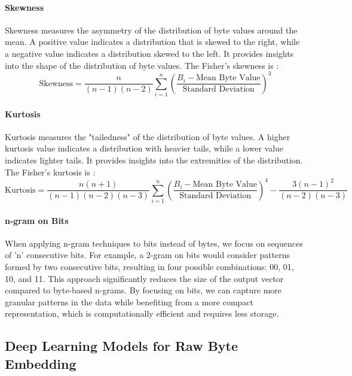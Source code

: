         \paragraph{Skewness}Skewness\cite{wheeler_problems_2011} measures the asymmetry of the distribution of byte values around the mean. A positive value indicates a distribution that is skewed to the right, while a negative value indicates a distribution skewed to the left. It provides insights into the shape of the distribution of byte values. The Fisher’s skewness\cite{cain_univariate_2017} is :
        \begin{equation}
        \text{Skewness} = \frac{n}{(n-1)(n-2)} \sum_{i=1}^{n} \left( \frac{B_i - \text{Mean Byte Value}}{\text{Standard Deviation}} \right)^3
        \label{eq:skewness}
        \end{equation}

        \paragraph{Kurtosis}Kurtosis\cite{wheeler_problems_2011} measures the "tailedness" of the distribution of byte values. A higher kurtosis value indicates a distribution with heavier tails, while a lower value indicates lighter tails. It provides insights into the extremities of the distribution. The Fisher’s kurtosis\cite{cain_univariate_2017} is :
        \begin{equation}
        \text{Kurtosis} = \frac{n(n+1)}{(n-1)(n-2)(n-3)} \sum_{i=1}^{n} \left( \frac{B_i - \text{Mean Byte Value}}{\text{Standard Deviation}} \right)^4 - \frac{3(n-1)^2}{(n-2)(n-3)}
        \label{eq:kurtosis}
        \end{equation}

        \paragraph{n-gram on Bits}When applying n-gram techniques to bits instead of bytes, we focus on sequences of 'n' consecutive bits. For example, a 2-gram on bits would consider patterns formed by two consecutive bits, resulting in four possible combinations: 00, 01, 10, and 11. This approach significantly reduces the size of the output vector compared to byte-based n-grams. By focusing on bits, we can capture more granular patterns in the data while benefiting from a more compact representation, which is computationally efficient and requires less storage.

\subsection{Deep Learning Models for Raw Byte Embedding}

